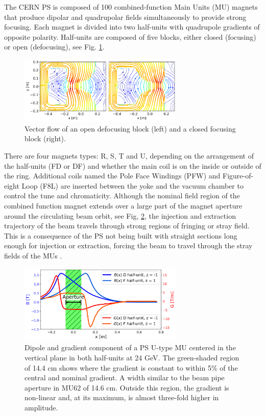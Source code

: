 The CERN PS is composed of 100 combined-function Main Units (MU) magnets that produce dipolar and quadrupolar fields simultaneously to provide strong focusing. Each magnet is divided into two half-units with quadrupole gradients of opposite polarity. Half-units are composed of five blocks,
either closed (focusing) or open (defocusing), see Fig. \ref{fig:vector_flow}.
\\

\begin{figure}[H]
\centering
\includegraphics[width=0.7\textwidth]{01_Introduction/images/vector_flow.png}
\caption{Vector flow of an open defocusing block (left) and a closed focusing block (right).}
\label{fig:vector_flow}
\end{figure}

There are four magnets types: R, S, T and U, depending on the arrangement of the half-units (FD or DF) and whether the main coil is on the inside or outside of the ring. Additional coils named the Pole Face Windings (PFW) and Figure-of-eight Loop (F8L) are inserted between the yoke and the vacuum chamber to control the tune and chromaticity. Although the nominal field region of the combined function
magnet extends over a large part of the magnet aperture around the circulating beam orbit, see Fig, \ref{fig:dipole_gradient_components}, the injection and extraction trajectory of the beam travels through strong regions of fringing or stray field. This is a consequence of the PS not being built with straight sections long enough for injection or extraction, forcing the beam to travel through the stray fields of the MUs \cite{risselada_beam_nodate}.
 
\begin{figure}[H]
\centering
\includegraphics[width=0.7\textwidth]{01_Introduction/images/dipole_gradient_components.png}
\caption{Dipole and gradient component of a PS U-type MU centered in the vertical plane in both half-units at 24 GeV. The green-shaded region of 14.4 cm shows where the gradient is constant to within 5\% of the central and nominal gradient. A width similar to the beam pipe aperture in MU62 of 14.6 cm. Outside this region, the gradient is non-linear and, at its maximum, is almost three-fold higher in amplitude.}
\label{fig:dipole_gradient_components}
\end{figure}

